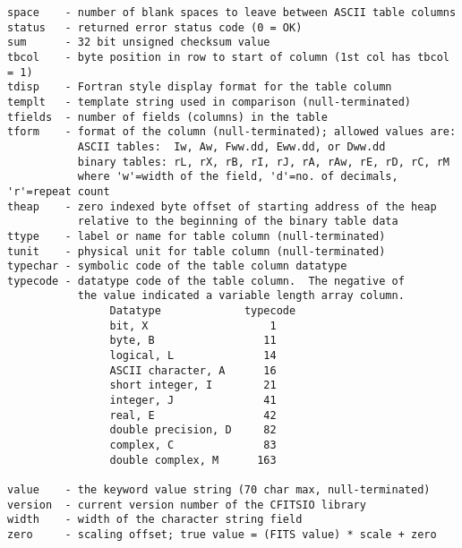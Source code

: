 \begin{verbatim}
space    - number of blank spaces to leave between ASCII table columns
status   - returned error status code (0 = OK)
sum      - 32 bit unsigned checksum value
tbcol    - byte position in row to start of column (1st col has tbcol = 1)
tdisp    - Fortran style display format for the table column
templt   - template string used in comparison (null-terminated)
tfields  - number of fields (columns) in the table
tform    - format of the column (null-terminated); allowed values are:
           ASCII tables:  Iw, Aw, Fww.dd, Eww.dd, or Dww.dd
           binary tables: rL, rX, rB, rI, rJ, rA, rAw, rE, rD, rC, rM
           where 'w'=width of the field, 'd'=no. of decimals, 'r'=repeat count
theap    - zero indexed byte offset of starting address of the heap
           relative to the beginning of the binary table data
ttype    - label or name for table column (null-terminated)
tunit    - physical unit for table column (null-terminated)
typechar - symbolic code of the table column datatype
typecode - datatype code of the table column.  The negative of
           the value indicated a variable length array column.
                Datatype             typecode
                bit, X                   1
                byte, B                 11
                logical, L              14
                ASCII character, A      16
                short integer, I        21
                integer, J              41
                real, E                 42
                double precision, D     82
                complex, C              83
                double complex, M      163

value    - the keyword value string (70 char max, null-terminated)
version  - current version number of the CFITSIO library
width    - width of the character string field
zero     - scaling offset; true value = (FITS value) * scale + zero
\end{verbatim}
%

